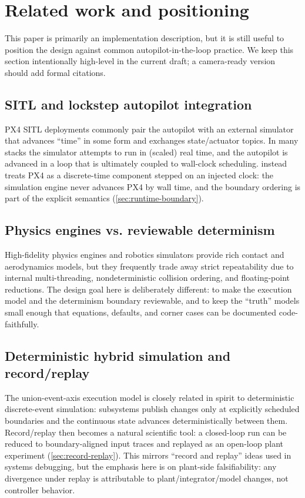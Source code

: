 \section{Related work and positioning}
\label{sec:related-work}

This paper is primarily an implementation description, but it is still useful to position the design against common autopilot-in-the-loop practice. We keep this section intentionally high-level in the current draft; a camera-ready version should add formal citations.

\subsection{SITL and lockstep autopilot integration}

PX4 SITL deployments commonly pair the autopilot with an external simulator that advances ``time'' in some form and exchanges state/actuator topics. In many stacks the simulator attempts to run in (scaled) real time, and the autopilot is advanced in a loop that is ultimately coupled to wall-clock scheduling.  instead treats PX4 as a discrete-time component stepped on an injected clock: the simulation engine never advances PX4 by wall time, and the boundary ordering is part of the explicit semantics (\cref{sec:runtime-boundary}).

\subsection{Physics engines vs. reviewable determinism}

High-fidelity physics engines and robotics simulators provide rich contact and aerodynamics models, but they frequently trade away strict repeatability due to internal multi-threading, nondeterministic collision ordering, and floating-point reductions. The design goal here is deliberately different: to make the execution model and the determinism boundary reviewable, and to keep the ``truth'' models small enough that equations, defaults, and corner cases can be documented code-faithfully.

\subsection{Deterministic hybrid simulation and record/replay}

The union-event-axis execution model is closely related in spirit to deterministic discrete-event simulation: subsystems publish changes only at explicitly scheduled boundaries and the continuous state advances deterministically between them. Record/replay then becomes a natural scientific tool: a closed-loop run can be reduced to boundary-aligned input traces and replayed as an open-loop plant experiment (\cref{sec:record-replay}). This mirrors ``record and replay'' ideas used in systems debugging, but the emphasis here is on plant-side falsifiability: any divergence under replay is attributable to plant/integrator/model changes, not controller behavior.

